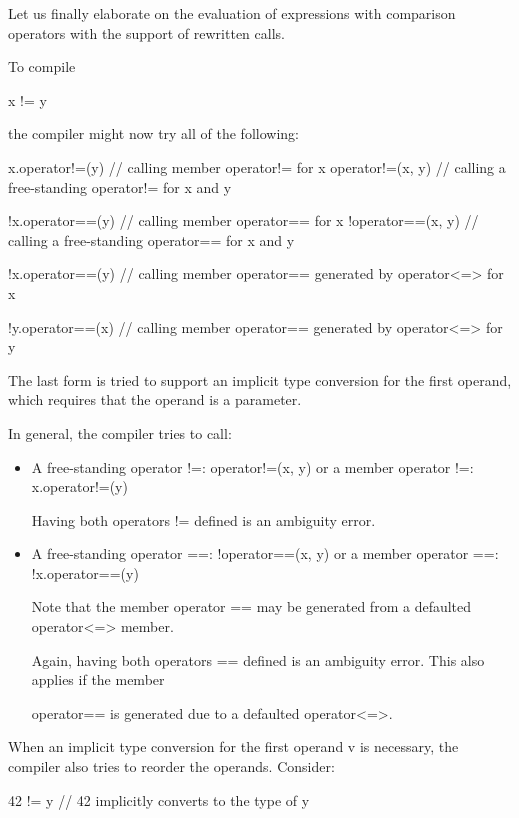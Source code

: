 Let us finally elaborate on the evaluation of expressions with comparison operators with the support of rewritten calls.



To compile

\begin{cpp}
x != y
\end{cpp}

the compiler might now try all of the following:

\begin{cpp}
x.operator!=(y) // calling member operator!= for x
operator!=(x, y) // calling a free-standing operator!= for x and y

!x.operator==(y) // calling member operator== for x
!operator==(x, y) // calling a free-standing operator== for x and y

!x.operator==(y) // calling member operator== generated by operator<=> for x

!y.operator==(x) // calling member operator== generated by operator<=> for y
\end{cpp}

The last form is tried to support an implicit type conversion for the first operand, which requires that the operand is a parameter.

In general, the compiler tries to call:

\begin{itemize}
\item
A free-standing operator !=: operator!=(x, y) or a member operator !=: x.operator!=(y)

Having both operators != defined is an ambiguity error.

\item
A free-standing operator ==: !operator==(x, y) or a member operator ==: !x.operator==(y)

Note that the member operator == may be generated from a defaulted operator<=> member.

Again, having both operators == defined is an ambiguity error. This also applies if the member

operator== is generated due to a defaulted operator<=>.
\end{itemize}

When an implicit type conversion for the first operand v is necessary, the compiler also tries to reorder the operands. Consider:

\begin{cpp}
42 != y // 42 implicitly converts to the type of y
\end{cpp}

